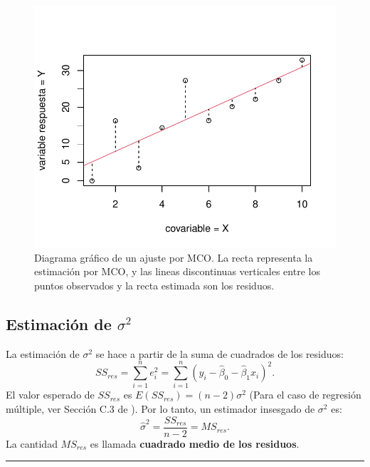 \documentclass[
]{article}
\begin{document}
\begin{figure}

{\centering \includegraphics{MLG1_files/figure-latex/Figresiduos-1} 

}

\caption{Diagrama gráfico de un ajuste por MCO. La recta representa la estimación por MCO, y las lineas discontinuas verticales entre los puntos observados y la recta estimada son los residuos.}\label{fig:Figresiduos}
\end{figure}

\hypertarget{estimaciuxf3n-de-sigma2}{%
\subsection{\texorpdfstring{Estimación de \(\sigma^{2}\)}{Estimación de \textbackslash sigma\^{}\{2\}}}\label{estimaciuxf3n-de-sigma2}}

La estimación de \(\sigma^{2}\) se hace a partir de la suma de cuadrados de los residuos:
\[
SS_{res} = \sum_{i=1}^{n}e^{2}_{i} = \sum_{i=1}^{n} (y_{i}-\widehat{\beta}_{0} - \widehat{\beta}_{1}x_{i})^{2}.
\]
El valor esperado de \(SS_{res}\) es \(E(SS_{res})=(n-2)\sigma^{2}\) (Para el caso de regresión múltiple, ver Sección C.3 de \citet{montgomery_introduction_2012}). Por lo tanto, un estimador insesgado de \(\sigma^{2}\) es:
\[
\widehat{\sigma}^{2} = \frac{SS_{res}}{n-2} = MS_{res}.
\]
La cantidad \(MS_{res}\) es llamada \textbf{cuadrado medio de los residuos}.

\rule{\textwidth}{0.4pt}
\end{document}
